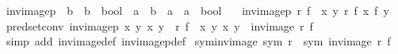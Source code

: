 \begin{isabellebody}
\isanewline
{}\isamarkupfalse%
\ inv{\isacharunderscore}{\kern0pt}imagep\ {\isacharcolon}{\kern0pt}{\isacharcolon}{\kern0pt}\ {\isachardoublequoteopen}{\isacharparenleft}{\kern0pt}{\isacharprime}{\kern0pt}b\ {\isasymRightarrow}\ {\isacharprime}{\kern0pt}b\ {\isasymRightarrow}\ bool{\isacharparenright}{\kern0pt}\ {\isasymRightarrow}\ {\isacharparenleft}{\kern0pt}{\isacharprime}{\kern0pt}a\ {\isasymRightarrow}\ {\isacharprime}{\kern0pt}b{\isacharparenright}{\kern0pt}\ {\isasymRightarrow}\ {\isacharprime}{\kern0pt}a\ {\isasymRightarrow}\ {\isacharprime}{\kern0pt}a\ {\isasymRightarrow}\ bool{\isachardoublequoteclose}\isanewline
\ \ \ {\isachardoublequoteopen}inv{\isacharunderscore}{\kern0pt}imagep\ r\ f\ {\isacharequal}{\kern0pt}\ {\isacharparenleft}{\kern0pt}{\isasymlambda}x\ y{\isachardot}{\kern0pt}\ r\ {\isacharparenleft}{\kern0pt}f\ x{\isacharparenright}{\kern0pt}\ {\isacharparenleft}{\kern0pt}f\ y{\isacharparenright}{\kern0pt}{\isacharparenright}{\kern0pt}{\isachardoublequoteclose}\isanewline
\isanewline
{}\isamarkupfalse%
\ {\isacharbrackleft}{\kern0pt}pred{\isacharunderscore}{\kern0pt}set{\isacharunderscore}{\kern0pt}conv{\isacharbrackright}{\kern0pt}{\isacharcolon}{\kern0pt}\ {\isachardoublequoteopen}inv{\isacharunderscore}{\kern0pt}imagep\ {\isacharparenleft}{\kern0pt}{\isasymlambda}x\ y{\isachardot}{\kern0pt}\ {\isacharparenleft}{\kern0pt}x{\isacharcomma}{\kern0pt}\ y{\isacharparenright}{\kern0pt}\ {\isasymin}\ r{\isacharparenright}{\kern0pt}\ f\ {\isacharequal}{\kern0pt}\ {\isacharparenleft}{\kern0pt}{\isasymlambda}x\ y{\isachardot}{\kern0pt}\ {\isacharparenleft}{\kern0pt}x{\isacharcomma}{\kern0pt}\ y{\isacharparenright}{\kern0pt}\ {\isasymin}\ inv{\isacharunderscore}{\kern0pt}image\ r\ f{\isacharparenright}{\kern0pt}{\isachardoublequoteclose}\isanewline
%
\isadelimproof
\ \ %
\endisadelimproof
%
\isatagproof
{}\isamarkupfalse%
\ {\isacharparenleft}{\kern0pt}simp\ add{\isacharcolon}{\kern0pt}\ inv{\isacharunderscore}{\kern0pt}image{\isacharunderscore}{\kern0pt}def\ inv{\isacharunderscore}{\kern0pt}imagep{\isacharunderscore}{\kern0pt}def{\isacharparenright}{\kern0pt}%
\endisatagproof
{\isafoldproof}%
%
\isadelimproof
\isanewline
%
\endisadelimproof
\isanewline
{}\isamarkupfalse%
\ sym{\isacharunderscore}{\kern0pt}inv{\isacharunderscore}{\kern0pt}image{\isacharcolon}{\kern0pt}\ {\isachardoublequoteopen}sym\ r\ {\isasymLongrightarrow}\ sym\ {\isacharparenleft}{\kern0pt}inv{\isacharunderscore}{\kern0pt}image\ r\ f{\isacharparenright}{\kern0pt}{\isachardoublequoteclose}\isanewline

\end{isabellebody}
